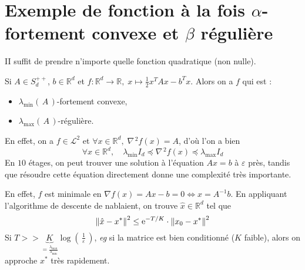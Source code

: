 \documentclass[11pt]{article}
\newcommand{\transpose}[1]{\ensuremath{#1^{\scriptscriptstyle T}}}
\newcommand{\dotpourvariable}{\:\cdot\:}
\newcommand{\ifempty}[3]{\ifx\hfuzz#1\hfuzz #2 \else #3\fi}
\newcommand{\norme}[1]{\left\lVert\ifempty{#1}{\dotpourvariable}{#1}\right\rVert}
\newcommand{\prt}[1]{\left( \, #1  \, \right)}
\newcommand{\R}{\mathbb{R}} %
\newcommand*{\e}{\ensuremath{\mathrm{e}}}
\def\eg{\textsl{eg}\xspace}
\begin{document}
\section{Exemple de fonction à la fois $\alpha$-fortement convexe et
 $\beta$ régulière}

 II suffit de prendre n'importe quelle fonction quadratique (non nulle).

 Si $A \in S_d^{++}$, $b \in \R^d$ et $f: \R^d \rightarrow \R, \; x \mapsto \frac{1}{2} \transpose{x}Ax-\transpose{b}x$.
 Alors on a $f$ qui est :
 \begin{itemize}
   \item $\lambda_{\min}\prt{A}$-fortement convexe,
   \item $\lambda_{\max}\prt{A}$-régulière.
 \end{itemize}

 En effet, on a $f \in \mathcal{L}^2$ et $ \forall x \in \R^d, \; \nabla\!^{\,2}f(x) = A$,
 d'où l'on a bien
 \begin{equation*}
   \forall x \in \R^d, \quad \lambda_{\min} I_d \preceq  \nabla\!^{\,2}f(x) \preceq
   \lambda_{\max} I_d
 \end{equation*}
 En $10$ étages, on peut trouver une solution à l'équation $Ax= b$ à $\varepsilon$
 près, tandis que résoudre cette équation directement donne une complexité très importante.

 En effet, $f$ est minimale en $\nabla\! f(x) = Ax-b = 0 \Leftrightarrow x=A^{-1}b$.
 En appliquant l'algorithme de descente de nabla\!ient, on trouve $\hat{x} \in \R^d$ tel que
 \begin{equation*}
\norme{\hat{x} - x^{*}}^2 \leq \e^{-T/K}\cdot \norme{x_0-x^{*}}^2
 \end{equation*}
 Si $T >> \underbrace{K}_{= \frac{\lambda_{\max}}{\lambda_{\min}}} \log \prt{\frac{1}{\varepsilon}} $, \eg si la matrice est bien conditionné ($K$ faible),
  alors on approche $x^{*}$ très rapidement.
\end{document}
